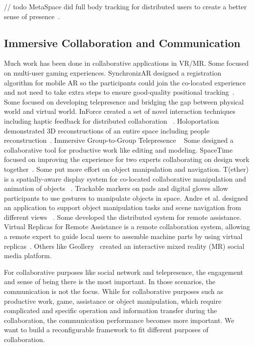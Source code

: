 \documentclass{sigchi}
\begin{document}
// todo
MetaSpace did full body tracking for distributed users to create a better sense of presence~\cite{sra2015metaspace}. 

\subsection{Immersive Collaboration and Communication}
Much work has been done in collaborative applications in VR/MR.
Some focused on multi-user gaming experiences. SynchronizAR designed a registration algorithm for mobile AR so the participants could join the co-located experience and not need to take extra steps to ensure good-quality positional tracking~\cite{huo2018synchronizar}.
Some focused on developing telepresence and bridging the gap between physical world and virtual world. InForce created a set of novel interaction techniques including haptic feedback for distributed collaboration ~\cite{nakagaki2019inforce}.
Holoportation demonstrated 3D reconstructions of an entire space including people reconstruction~\cite{orts2016holoportation}.
Immersive Group-to-Group Telepresence ~\cite{beck2013immersive}
Some designed a collaborative tool for productive work like editing and modeling. SpaceTime focused on improving the experience for two experts collaborating on design work together~\cite{xia2018spacetime}. 
Some put more effort on object manipulation and navigation.
T(ether) is a spatially-aware display system for co-located collaborative manipulation and animation of objects ~\cite{lakatos2014t}. Trackable markers on pads and digital gloves allow participants to use gestures to manipulate objects in space.
Andre et al. designed an application to support object manipulation tasks and scene navigation from different views ~\cite{kunert2019multi}.
Some developed the distributed system for remote assistance.
Virtual Replicas for Remote Assistance is a remote collaboration system, allowing a remote expert to guide local users to assemble machine parts by using virtual replicas~\cite{oda2015virtual}.
Others like Geollery~\cite{du2019geollery, du2016social} created an interactive mixed reality (MR) social media platform.

For collaborative purposes like social network and telepresence, the engagement and sense of being there is the most important. In those scenarios, the communication is not the focus. While for collaborative purposes such as productive work, game, assistance or object manipulation, which require complicated and specific operation and information transfer during the collaboration, the communication performance becomes more important. We want to build a reconfigurable framework to fit different purposes of collaboration.
\end{document}

